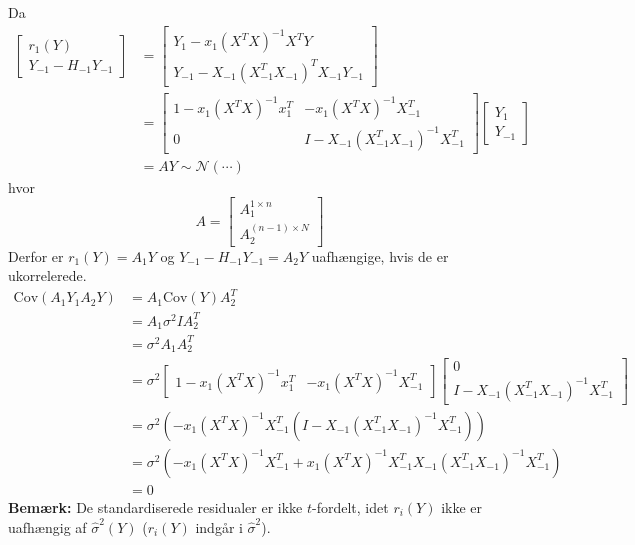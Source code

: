 \documentclass[12pt,a4paper]{report}
\begin{document}
Da
\begin{align*}
\begin{bmatrix}
r_1(Y)\\
Y_{-1}-H_{-1}Y_{-1}
\end{bmatrix}&=
\begin{bmatrix}
Y_1-x_1(X^TX)^{-1}X^TY\\
Y_{-1}-X_{-1}(X_{-1}^TX_{-1})^TX_{-1}Y_{-1}
\end{bmatrix}\\
&=\begin{bmatrix}
1-x_1(X^TX)^{-1}x_1^T&-x_1(X^TX)^{-1}X_{-1}^T\\
0&I-X_{-1}(X_{-1}^TX_{-1})^{-1}X_{-1}^T
\end{bmatrix}\begin{bmatrix}
Y_1\\
Y_{-1}
\end{bmatrix}\\
&=AY\sim\mathcal{N}(\cdots)
\end{align*}
hvor
\begin{equation*}
A=\begin{bmatrix}
A_1^{1\times n}\\
A_2^{(n-1)\times N}
\end{bmatrix}
\end{equation*}
Derfor er $r_1(Y)=A_1Y$ og $Y_{-1}-H_{-1}Y_{-1}=A_2Y$ uafhængige, hvis de er ukorrelerede.
\begin{align*}
\text{Cov}(A_1Y_1A_2Y)&=A_1\text{Cov}(Y)A_2^T\\
&=A_1\sigma^2IA_2^T\\
&=\sigma^2A_1A_2^T\\
&=\sigma^2\begin{bmatrix}1-x_1(X^TX)^{-1}x_1^T&-x_1(X^TX)^{-1}X_{-1}^T\end{bmatrix}\begin{bmatrix}0\\I-X_{-1}(X_{-1}^TX_{-1})^{-1}X_{-1}^T\end{bmatrix}\\
&=\sigma^2\left(-x_1(X^TX)^{-1}X_{-1}^T\left(I-X_{-1}(X_{-1}^TX_{-1})^{-1}X_{-1}^T\right)\right)\\
&=\sigma^2\left(-x_1(X^TX)^{-1}X_{-1}^T+x_1(X^TX)^{-1}X_{-1}^TX_{-1}(X_{-1}^TX_{-1})^{-1}X_{-1}^T\right)\\
&=0
\end{align*}
\textbf{Bemærk:} De standardiserede residualer er ikke $t$-fordelt, idet $r_i(Y)$ ikke er uafhængig af $\hat{\sigma}^2(Y)$ ($r_i(Y)$ indgår i $\hat{\sigma}^2$).\\\\
\end{document}
